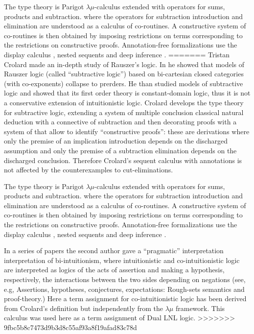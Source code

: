 {The type theory is Parigot $\lambda\mu$-calculus extended with operators for sums, products and subtraction. 
where the operators for subtraction introduction and elimination are understood as a calculus of co-routines.
A constructive system of co-routines is then obtained by imposing restrictions on terms corresponding to the restrictions
 on constructive proofs.  Annotation-free formalizations use the display calculus \cite{Gore:2000}, nested sequents
\cite{GorePostnieceTiu:2008} and deep inference \cite{Postniece:2009}.
=======
Tristan Crolard \cite{Crolard:2001,Crolard:2004} made an in-depth
study of Rauszer's logic. In \cite{Crolard:2001} he showed that models
of Rauszer logic (called ``subtractive logic'') based on bi-cartesian
closed categories (with co-exponents) collapse to prerders.  He than
studied models of subtractive logic and showed that its first order
theory is constant-domain logic, thus it is not a conservative
extension of intuitionistic logic.  Crolard \cite{Crolard:2004}
develops the type theory for subtractive logic, extending a system of
multiple conclusion classical natural deduction with a connective of
subtraction and then decorating proofs with a system of
\cite{annotationsofdependencies} that allow to identify ``constructive
proofs'': these are derivations where only the premise of an
implication introduction depends on the discharged assumption and only
the premise of a subtraction elimination depends on the discharged
conclusion. Therefore Crolard's sequent calculus with annotations is
not affected by the counterexamples to cut-eliminations.

The type theory is Parigot $\lambda\mu$-calculus extended with
operators for sums, products and subtraction.  where the operators for
subtraction introduction and elimination are understood as a calculus
of co-routines.  A constructive system of co-routines is then obtained
by imposing restrictions on terms corresponding to the restrictions on
constructive proofs.  Annotation-free formalizations use the display
calculus \cite{Gore:2000}, nested sequents \cite{GorePostnieceTiu:2008}
and deep inference \cite{Postniece:2009}.

In a series of papers the second author gave a ``pragmatic''
interpretation interpretation of bi-intuitionism, where intuitionistic
and co-intuitionistic logic are interpreted as logics of the acts of
assertion and making a hypothesis, respectively, the interactions
between the two sides depending on negations (see, e.g,
\cite{Bellin:2014} Assertions, hypotheses, conjectures, expectations:
Rough-sets semantics and proof-theory.)  Here a term assignment for
co-intuitionistic logic has been derived from Crolard's definition but
independently from the $\lambda\mu$ framework. This calculus was used
here as a term assignment of Dual LNL logic.
>>>>>>> 9fbc5b8c7473d9b3d8c55af93a8f19afad83c78d

}
